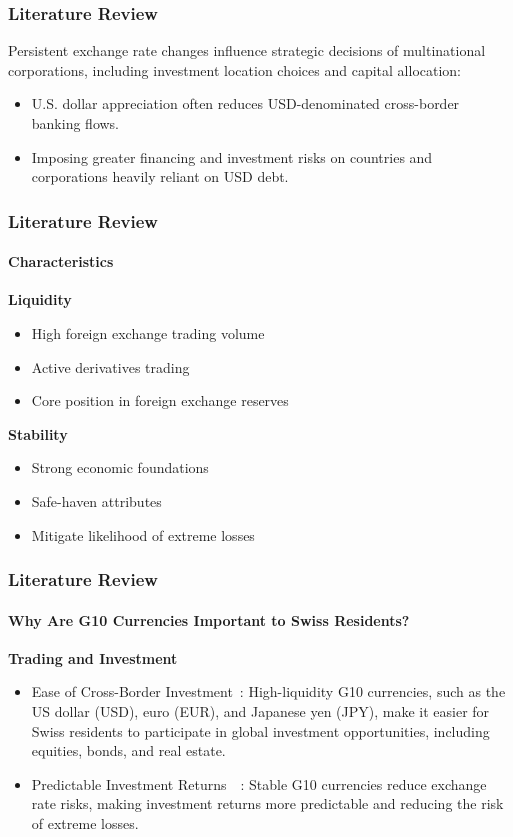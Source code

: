 \documentclass[10pt]{beamer}
\begin{document}
\begin{frame}
\frametitle{Literature Review}
Persistent exchange rate changes influence strategic decisions of multinational corporations, including investment location
choices and capital allocation:~\cite{riker2020review}
\begin{itemize}
    \item U.S. dollar appreciation often reduces USD-denominated cross-border banking flows.~\cite{dollar_exchange}
    \item Imposing greater financing and investment risks on countries and corporations heavily reliant on USD debt.~\cite{dollar_exchange}
\end{itemize}
\end{frame}
\begin{frame}
\frametitle{Literature Review}
\framesubtitle{Characteristics}
\textbf{Liquidity}~\cite{rogoff2000six}
\begin{itemize}
    \item High foreign exchange trading volume
    \item Active derivatives trading
    \item Core position in foreign exchange reserves
\end{itemize}
\textbf{Stability}~\cite{campbell2002strategic}~\cite{engel2016exchange}
\begin{itemize}
    \item Strong economic foundations
    \item Safe-haven attributes
    \item Mitigate likelihood of extreme losses
\end{itemize}
\end{frame}
\begin{frame}
\frametitle{Literature Review}
\framesubtitle{Why Are G10 Currencies Important to Swiss Residents?}
\textbf{Trading and Investment}
\begin{itemize}
    \item Ease of Cross-Border Investment~\cite{rogoff2000six}: High-liquidity G10 currencies, such as the US dollar (USD), euro (EUR), and Japanese yen (JPY), make it easier for Swiss residents to participate in global investment opportunities, including equities, bonds, and real estate.
    \item Predictable Investment Returns~\cite{campbell2002strategic}~\cite{engel2016exchange}: Stable G10 currencies reduce exchange rate risks, making investment returns more predictable and reducing the risk of extreme losses.
\end{itemize}
\end{frame}
\end{document}
